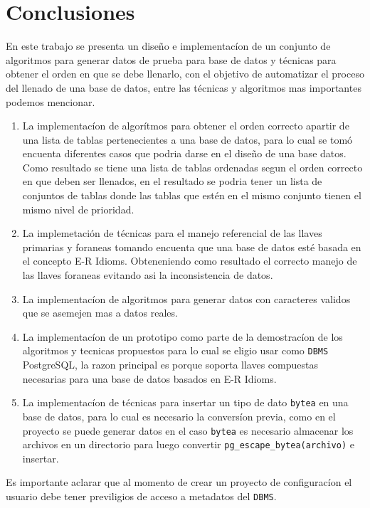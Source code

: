 \chapter{Conclusiones}
En este trabajo se presenta un dise\~no e implementac\'ion de un conjunto de algoritmos para generar datos de prueba para base de datos y t\'ecnicas para obtener el orden en que se debe llenarlo, con el objetivo de automatizar el proceso del llenado de una base de datos, entre las t\'ecnicas y algoritmos mas importantes podemos mencionar.

\begin{enumerate}
\item La implementac\'ion de algor\'itmos para obtener el orden correcto apartir de una lista de tablas pertenecientes a una base de datos, para lo cual se tom\'o encuenta diferentes casos que podria darse en el dise\~no de una base datos. Como resultado se tiene una lista de tablas ordenadas segun el orden correcto en que deben ser llenados, en el resultado se podria tener un lista de conjuntos de tablas donde las tablas que est\'en en el mismo conjunto tienen el mismo nivel de prioridad.
\item La implemetaci\'on de t\'ecnicas para el manejo referencial de las llaves primarias y foraneas tomando encuenta que una base de datos est\'e  basada en el concepto E-R Idioms. Obteneniendo como resultado el correcto manejo de las llaves foraneas evitando asi la inconsistencia de datos.
\item La implementac\'ion de algoritmos para generar datos con caracteres validos que se asemejen mas a datos reales.
\item La implementac\'ion de un prototipo como parte de la demostrac\'ion de los algoritmos y tecnicas propuestos para lo cual se eligio usar como \texttt{DBMS} PostgreSQL, la razon principal es porque soporta llaves compuestas necesarias para una base de datos basados en E-R Idioms.  
\item La implementac\'ion de t\'ecnicas para insertar un tipo de dato \texttt{bytea} en una base de datos, para lo cual es necesario la convers\'ion previa, como en el proyecto se puede generar datos en el caso \texttt{bytea} es necesario almacenar los archivos en un directorio para luego convertir \texttt{pg\_escape\_bytea(archivo)} e insertar.
\end{enumerate}

Es importante aclarar que al momento de crear un proyecto de configurac\'ion el usuario debe tener previligios de acceso a metadatos del \texttt{DBMS}.